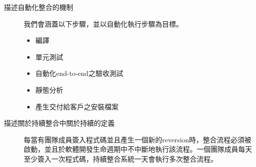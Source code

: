 \documentclass[12pt]{article}
\begin{document}
\begin{description}
\item[描述自動化整合的機制]
我們會涵蓋以下步驟，並以自動化執行步驟為目標。
\begin{itemize}
\item 編譯
\item 單元測試
\item 自動化end-to-end之驗收測試
\item 靜態分析
\item 產生交付給客戶之安裝檔案
\end{itemize}

\item[描述關於持續整合中關於持續的定義] 每當有團隊成員簽入程式碼並且產生一個新的reversion時，整合流程必須被啟動，並且於軟體開發生命週期中不中斷地執行該流程。一個團隊成員每天至少簽入一次程式碼，持續整合系統一天會執行多次整合流程。
\end{description}
\end{document}
